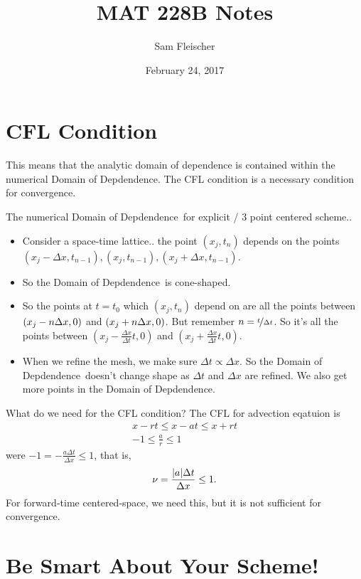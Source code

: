 \documentclass{article}
\title{MAT 228B Notes}
\author{Sam Fleischer}
\date{February 24, 2017}
\newcommand{\Dx}{\Delta x}
\newcommand{\Dt}{\Delta t}
\newcommand{\dod}{Domain of Depdendence}
\begin{document}
    \maketitle

    \section{CFL Condition}

        This means that the analytic domain of dependence is contained within the numerical \dod.  The CFL condition is a necessary condition for convergence.

        \noindent The numerical \dod\ for explicit / 3 point centered scheme..
        \begin{itemize}
            \item Consider a space-time lattice.. the point $(x_j,t_n)$ depends on the points $(x_j - \Dx,t_{n-1}), (x_j,t_{n-1}), (x_j + \Dx,t_{n-1})$.
            \item So the \dod\ is cone-shaped.
            \item So the points at $t= t_0$ which $(x_j,t_n)$ depend on are all the points between $\qty(x_j - n\Dx,0)$ and $\qty(x_j + n\Dx,0)$.  But remember $n = \nicefrac{t}{\Dt}$.  So it's all the points between $(x_j - \frac{\Dx}{\Dt}t,0)$ and $(x_j + \frac{\Dx}{\Dt}t,0)$.
            \item When we refine the mesh, we make sure $\Dt \propto \Dx$.  So the \dod\ doesn't change shape as $\Dt$ and $\Dx$ are refined.  We also get more points in the \dod.
        \end{itemize}
        What do we need for the CFL condition?  The CFL for advection eqatuion is 
        \begin{align*}
            x - rt \leq x - at \leq x + rt \\
            -1 \leq \frac{a}{r} \leq 1
        \end{align*}
        were $-1 = -\frac{a\Dt}{\Dx} \leq 1$, that is,
        \begin{align*}
            \nu = \frac{\abs{a}\Dt}{\Dx} \leq 1.
        \end{align*}
        For forward-time centered-space, we need this, but it is not sufficient for convergence.

    \section{Be Smart About Your Scheme!}
\end{document}
